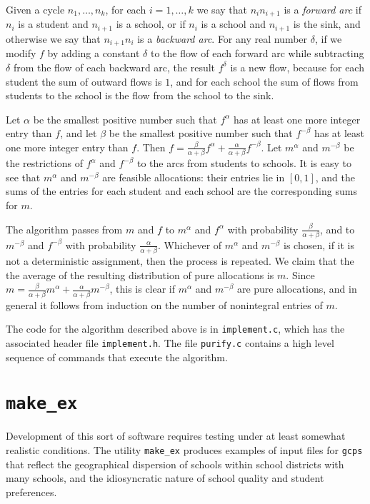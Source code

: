 \documentclass[12pt]{article}
\theoremstyle{definition}
\begin{document}
Given a cycle $n_1, \ldots, n_k$, for each $i = 1, \ldots, k$ we say
that $n_in_{i+1}$ is a \emph{forward arc} if $n_i$ is a student and
$n_{i+1}$ is a school, or if $n_i$ is a school and $n_{i+1}$ is the
sink, and otherwise we say that $n_{i+1}n_i$ is a \emph{backward arc}.
For any real number $\delta$, if we modify $f$ by adding a constant
$\delta$ to the flow of each forward arc while subtracting $\delta$
from the flow of each backward arc, the result $f^\delta$ is a new
flow, because for each student the sum of outward flows is $1$, and
for each school the sum of flows from students to the school is the
flow from the school to the sink.

Let $\alpha$ be the smallest positive number such that $f^\alpha$ has
at least one more integer entry than $f$, and let $\beta$ be the
smallest positive number such that $f^{-\beta}$ has at least one more
integer entry than $f$.  Then $f = \tfrac{\beta}{\alpha +
  \beta}f^\alpha + \tfrac{\alpha}{\alpha + \beta}f^{-\beta}$.  Let
$m^\alpha$ and $m^{-\beta}$ be the restrictions of $f^\alpha$ and
$f^{-\beta}$ to the arcs from students to schools.  It is easy to see
that $m^\alpha$ and $m^{-\beta}$ are feasible allocations: their
entries lie in $[0,1]$, and the sums of the entries for each student
and each school are the corresponding sums for $m$.

The algorithm passes from $m$ and $f$ to $m^\alpha$ and $f^{\alpha}$
with probability $\tfrac{\beta}{\alpha + \beta}$, and to $m^{-\beta}$
and $f^{-\beta}$ with probability $\tfrac{\alpha}{\alpha + \beta}$.
Whichever of $m^\alpha$ and $m^{-\beta}$ is chosen, if it is not a
deterministic assignment, then the process is repeated.  We claim that
the the average of the resulting distribution of pure allocations is
$m$.  Since $m = \tfrac{\beta}{\alpha + \beta}m^\alpha +
\tfrac{\alpha}{\alpha + \beta}m^{-\beta}$, this is clear if $m^\alpha$
and $m^{-\beta}$ are pure allocations, and in general it follows from
induction on the number of nonintegral entries of $m$.

The code for the algorithm described above is in \texttt{implement.c},
which has the associated header file \texttt{implement.h}.  The file
\texttt{purify.c} contains a high level sequence of commands that
execute the algorithm.

\section{\texttt{make\_ex}}

Development of this sort of software requires testing under at least
somewhat realistic conditions.  The utility \texttt{make\_ex} produces
examples of input files for \texttt{gcps} that reflect the
geographical dispersion of schools within school districts with many
schools, and the idiosyncratic nature of school quality and student
preferences.
\end{document}
